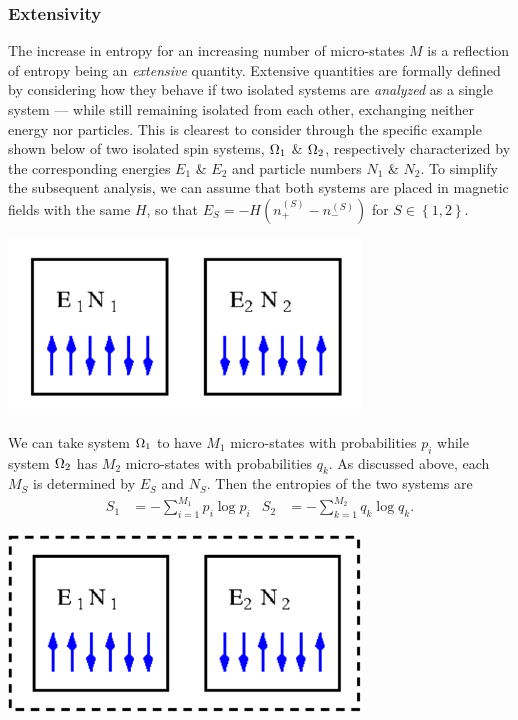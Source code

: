 \subsubsection{Extensivity}
The increase in entropy for an increasing number of micro-states $M$ is a reflection of entropy being an \textit{extensive} quantity.
Extensive quantities are formally defined by considering how they behave if two isolated systems are \textit{analyzed} as a single system --- while still remaining isolated from each other, exchanging neither energy nor particles.
This is clearest to consider through the specific example shown below of two isolated spin systems, $\Omega_1$ \& $\Omega_2$, respectively characterized by the corresponding energies $E_1$ \& $E_2$ and particle numbers $N_1$ \& $N_2$.
To simplify the subsequent analysis, we can assume that both systems are placed in magnetic fields with the same $H$, so that $E_S = -H\left(n_+^{(S)} - n_-^{(S)}\right)$ for $S \in \left\{1, 2\right\}$.
\begin{center}
  \includegraphics[width=0.7\textwidth]{figs/unit02_entropy-separate.pdf}
\end{center}

We can take system $\Omega_1$ to have $M_1$ micro-states with probabilities $p_i$ while system $\Omega_2$ has $M_2$ micro-states with probabilities $q_k$.
As discussed above, each $M_S$ is determined by $E_S$ and $N_S$.
Then the entropies of the two systems are
\begin{align*}
  S_1 & = - \sum_{i = 1}^{M_1} p_i \log p_i &
  S_2 & = - \sum_{k = 1}^{M_2} q_k \log q_k.
\end{align*}

\begin{center}
  \includegraphics[width=0.7\textwidth]{figs/unit02_entropy-combo.pdf}
\end{center}

